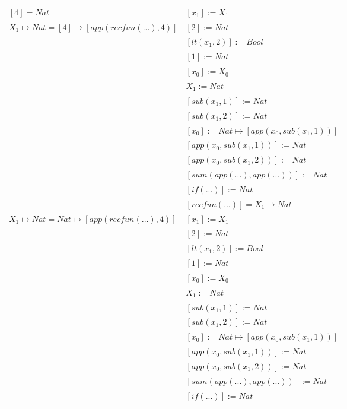 \begin{exercise}
\begin{description}
\begin{center}
\begin{longtable}{ | l | l | }
                    \hline
                        $[4] = Nat$ &  $[x_1] := X_1$ \\
                        $ X_1 \mapsto Nat = [4] \mapsto [app(recfun(...), 4)]$ & $[2] := Nat$ \\
                        & $[lt(x_1 , 2)] := Bool$ \\
                        & $[1] := Nat$ \\
                        & $[x_0] := X_0$ \\
                        & $X_1 := Nat$ \\
                        & $[sub(x_1,1)] := Nat$ \\
                        & $[sub(x_1,2)] := Nat$ \\
                        & $[x_0] := Nat \mapsto [app(x_0, sub(x_1,1))]$ \\
                        & $[app(x_0, sub(x_1,1))] := Nat$ \\
                        & $[app(x_0, sub(x_1,2))] := Nat$ \\
                        & $[sum(app(...), app(...))] := Nat$ \\
                        & $[if(...)] := Nat $ \\
                        & $[recfun(...)] = X_1 \mapsto Nat$ \\
                    \hline
                        $ X_1 \mapsto Nat = Nat \mapsto [app(recfun(...), 4)]$ & $[x_1] := X_1$ \\
                        & $[2] := Nat$ \\
                        & $[lt(x_1 , 2)] := Bool$ \\
                        & $[1] := Nat$ \\
                        & $[x_0] := X_0$ \\
                        & $X_1 := Nat$ \\
                        & $[sub(x_1,1)] := Nat$ \\
                        & $[sub(x_1,2)] := Nat$ \\
                        & $[x_0] := Nat \mapsto [app(x_0, sub(x_1,1))]$ \\
                        & $[app(x_0, sub(x_1,1))] := Nat$ \\
                        & $[app(x_0, sub(x_1,2))] := Nat$ \\
                        & $[sum(app(...), app(...))] := Nat$ \\
                        & $[if(...)] := Nat $ \\

\end{longtable}
\end{center}
\end{description}
\end{exercise}
